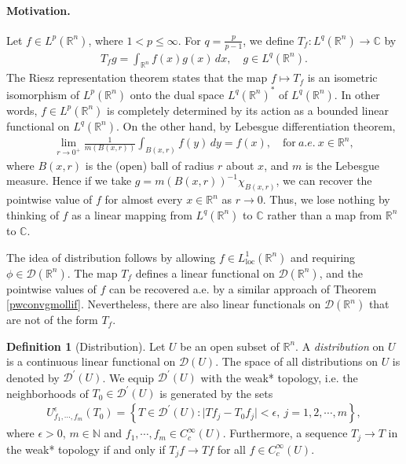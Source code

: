 \documentclass{article}
\numberwithin{equation}{section}
\newcommand{\bbC}{\mathbb{C}}
\newcommand{\bbN}{\mathbb{N}}
\newcommand{\bbR}{\mathbb{R}}
\renewcommand{\cal}{\mathcal}
\newcommand{\loc}{\mathrm{loc}}
\theoremstyle{plain}
\theoremstyle{definition}
\newtheorem{definition}[theorem]{Definition}
\begin{document}
\paragraph{Motivation.} Let $f\in L^p(\bbR^n)$, where $1<p\leq\infty$. For $q=\frac{p}{p-1}$, we define $T_f:L^q(\bbR^n)\to\bbC$ by
\begin{align*}
	T_f g=\int_{\bbR^n} f(x)g(x)\,dx,\quad g\in L^q(\bbR^n).
\end{align*}
The Riesz representation theorem states that the map $f\mapsto T_f$ is an isometric isomorphism of $L^p(\bbR^n)$ onto the dual space $L^q(\bbR^n)^*$ of $L^q(\bbR^n)$. In other words, $f\in L^p(\bbR^n)$ is completely determined by its action as a bounded linear functional on $L^q(\bbR^n)$. On the other hand, by Lebesgue differentiation theorem,
\begin{align*}
	\lim_{r\to 0^+}\frac{1}{m(B(x,r))}\int_{B(x,r)}f(y)\,dy=f(x),\quad\text{for}\ a.e.\ x\in\bbR^n,
\end{align*}
where $B(x,r)$ is the (open) ball of radius $r$ about $x$, and $m$ is the Lebesgue measure. Hence if we take $g=m(B(x,r))^{-1}\chi_{B(x,r)}$, we can recover the pointwise value of $f$ for almost every $x\in\bbR^n$ as $r\to 0$. Thus, we lose nothing by thinking of $f$ as a linear mapping from $L^q(\bbR^n)$ to $\bbC$ rather than a map from $\bbR^n$ to $\bbC$.

The idea of distribution follows by allowing $f\in L^1_\loc(\bbR^n)$ and requiring $\phi\in\cal{D}(\bbR^n)$. The map $T_f$ defines a linear functional on $\cal{D}(\bbR^n)$, and the pointwise values of $f$ can be recovered a.e. by a similar approach of Theorem \ref{pwconvgmollif}. Nevertheless, there are also linear functionals on $\cal{D}(\bbR^n)$ that are not of the form $T_f$. 



\begin{definition}[Distribution]
Let $U$ be an open subset of $\bbR^n$. A \textit{distribution} on $U$ is a continuous linear functional on $\cal{D}(U)$. The space of all distributions on $U$ is denoted by $\cal{D}^\prime(U)$. We equip $\cal{D}^\prime(U)$ with the weak* topology, i.e. the neighborhoods of $T_0\in\cal{D}^\prime(U)$ is generated by the sets
\begin{align*}
	U^\epsilon_{f_1,\cdots,f_m}(T_0)=\left\{T\in\cal{D}^\prime(U):\vert Tf_j-T_0f_j\vert<\epsilon,\ j=1,2,\cdots,m\right\},
\end{align*}
where $\epsilon>0$, $m\in\bbN$ and $f_1,\cdots,f_m\in C_c^\infty(U)$. Furthermore, a sequence $T_j\to T$ in the weak* topology if and only if $T_jf\to Tf$ for all $f\in C_c^\infty(U)$.
\end{definition}
\end{document}
